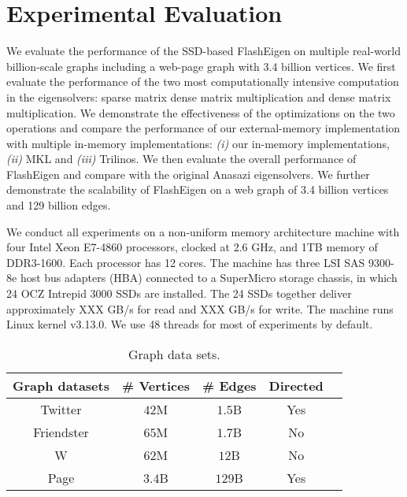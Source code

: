 \section{Experimental Evaluation}

We evaluate the performance of the SSD-based FlashEigen on multiple real-world
billion-scale graphs including a web-page graph with 3.4 billion vertices.
We first evaluate the performance
of the two most computationally intensive computation in the eigensolvers:
sparse matrix dense matrix multiplication and dense matrix multiplication.
We demonstrate the effectiveness of the optimizations on the two operations
and compare the performance of our external-memory implementation with
multiple in-memory implementations: \textit{(i)} our in-memory implementations,
\textit{(ii)} MKL and \textit{(iii)} Trilinos. We then evaluate the overall
performance of FlashEigen and compare with the original Anasazi eigensolvers.
We further demonstrate the scalability
of FlashEigen on a web graph of 3.4 billion vertices and 129 billion edges.

We conduct all experiments on a non-uniform memory architecture machine with
four Intel Xeon E7-4860 processors, clocked at 2.6 GHz, and 1TB memory of
DDR3-1600. Each processor has 12 cores. The machine has three LSI SAS 9300-8e
host bus adapters (HBA) connected to a SuperMicro storage chassis, in which
24 OCZ Intrepid 3000 SSDs are installed. The 24 SSDs together deliver
approximately XXX GB/s for read and XXX GB/s for write. The machine runs
Linux kernel v3.13.0. We use 48 threads for most of experiments by default.

\begin{table}
\begin{center}
\footnotesize
\begin{tabular}{|c|c|c|c|c|}
\hline
Graph datasets & \# Vertices & \# Edges & Directed \\
\hline
Twitter \cite{twitter} & $42$M & $1.5$B & Yes \\
\hline
Friendster \cite{friendster} & $65$M & $1.7$B & No \\
\hline
W \cite{} & $62$M & $12$B & No \\
\hline
Page \cite{web_graph} & $3.4$B & $129$B & Yes \\
\hline
\end{tabular}
\normalsize
\end{center}
\vspace{-10pt}
\caption{Graph data sets.}
\label{graphs}
\end{table}

